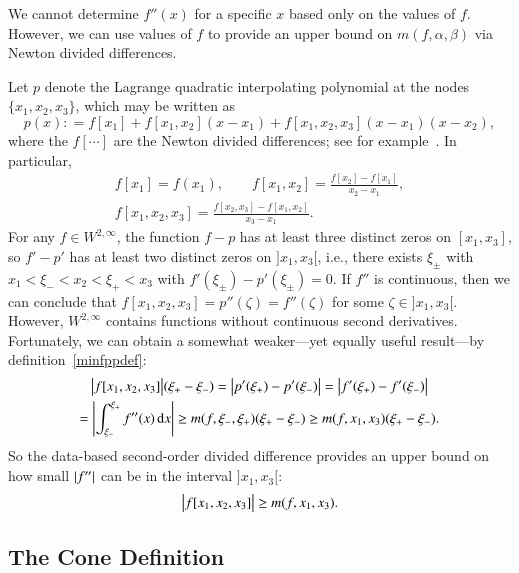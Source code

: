 \documentclass[review]{elsarticle}
\theoremstyle{definition}
\renewcommand{\cw}{W}
\begin{document}
We cannot determine $f''(x)$ for a specific $x$ based only on the values of $f$. However,
we can use values of $f$ to provide an upper bound on $m(f,\alpha, \beta)$ via Newton divided differences.

Let $p$ denote the Lagrange quadratic interpolating polynomial at the nodes
$\{x_1, x_2, x_3\}$, which may be written as
\begin{equation*}
p(x) : = f[x_1] + f[x_1, x_2](x-x_1) + f[x_1, x_2, x_3](x-x_1)(x-x_2),
\end{equation*}
where the $f[\cdots]$ are the Newton divided differences; see for example~\cite{CheKin12a}. In particular,
\begin{gather}
\nonumber
f[x_1] = f(x_1), \qquad f[x_1, x_2] = \frac{f[x_2] - f[x_1]}{x_2-x_1},  \\
f[x_1, x_2,x_3] = \frac{f[x_2,x_3] - f[x_1,x_2]}{x_3-x_1}. \label{divdiff}
\end{gather}
For any $f \in
\cw^{2,\infty}$, the function $f - p$ has at least three distinct zeros on
$[x_1, x_3]$, so $f' - p'$ has at least two distinct zeros on $]x_1, x_3[$,
i.e., there exists $\xi_\pm$ with $x_1 < \xi_- < x_2 < \xi_+ < x_3$ with
$f'(\xi_\pm) - p'(\xi_{\pm}) = 0$. If $f''$ is continuous, then we can conclude
that $ f[x_1, x_2, x_3]= p''(\zeta) =f''(\zeta) $ for some $\zeta \in ]x_1,
x_3[$. However, $\cw^{2,\infty}$ contains functions without continuous
second derivatives. Fortunately, we can obtain a somewhat weaker---yet equally useful result---by  definition~\eqref{minfppdef}:
\begin{multline*}
\bigl \lvert f[x_1, x_2, x_3] \bigr \rvert(\xi_+  - \xi_-) = \left \lvert p'(\xi_+) - p'(\xi_-) \right \rvert =  \left \lvert f'(\xi_+) - f'(\xi_-) \right \rvert \\
= \left \lvert \int_{\xi_-}^{\xi_+} f''(x) \, {\rm d} x \right \rvert \ge m(f,\xi_-, \xi_+) (\xi_+  - \xi_-)  \ge m(f,x_1, x_3) (\xi_+  - \xi_-) .
\end{multline*}
So the data-based second-order divided difference provides an upper
bound on how small $\left \lvert f'' \right \rvert$ can be in the interval $]x_1, x_3[$:
\begin{equation} \label{NDDbdm}
\bigl \lvert f[x_1, x_2, x_3] \bigr \rvert \ge m(f,x_1, x_3).
\end{equation}

\subsection{The Cone Definition}  \label{sec:conedef}
\end{document}
